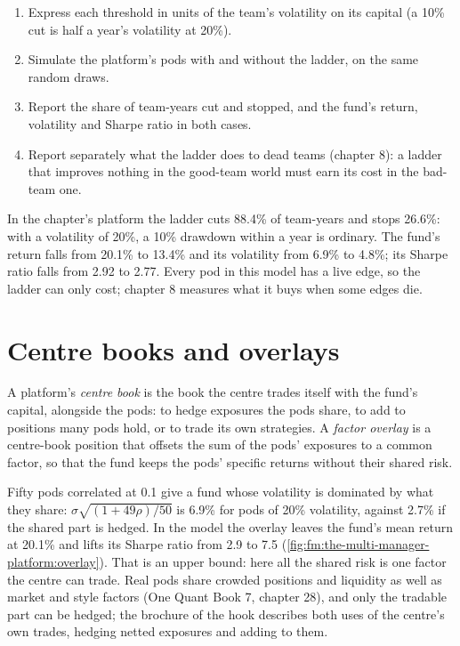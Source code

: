 \begin{method}\label{met:fm:the-multi-manager-platform:ladder}
\begin{enumerate}
\item Express each threshold in units of the team's volatility on its capital (a 10\% cut is half a year's volatility at 20\%).
\item Simulate the platform's pods with and without the ladder, on the same random draws.
\item Report the share of team-years cut and stopped, and the fund's return, volatility and Sharpe ratio in both cases.
\item Report separately what the ladder does to dead teams (chapter 8): a ladder that improves nothing in the good-team world must earn its cost
in the bad-team one.
\end{enumerate}
\end{method}

In the chapter's platform the ladder cuts 88.4\% of team-years and stops 26.6\%: with a volatility of 20\%, a 10\% drawdown within a year is
ordinary. The fund's return falls from 20.1\% to 13.4\% and its volatility from 6.9\% to 4.8\%; its Sharpe ratio falls from 2.92 to 2.77. Every
pod in this model has a live edge, so the ladder can only cost; chapter 8 measures what it buys when some edges die.

\section{Centre books and overlays}

\begin{definition}\label{def:fm:the-multi-manager-platform:centre}
A platform's \emph{centre book} is the book the centre trades itself with the fund's capital, alongside the pods: to hedge
exposures the pods share, to add to positions many pods hold, or to trade its own strategies. A \emph{factor overlay} is a
centre-book position that offsets the sum of the pods' exposures to a common factor, so that the fund keeps the pods' specific returns without
their shared risk.
\end{definition}

Fifty pods correlated at 0.1 give a fund whose volatility is dominated by what they share: $\sigma\sqrt{(1+49\rho)/50}$ is 6.9\% for pods of 20\%
volatility, against 2.7\% if the shared part is hedged. In the model the overlay leaves the fund's mean return at 20.1\% and lifts its Sharpe
ratio from 2.9 to 7.5 (\cref{fig:fm:the-multi-manager-platform:overlay}). That is an upper bound: here all the shared risk is one factor the
centre can trade. Real pods share crowded positions and liquidity as well as market and style factors (One Quant Book 7, chapter 28), and only
the tradable part can be hedged; the brochure of the hook describes both uses of the centre's own trades, hedging netted exposures and adding to
them.

